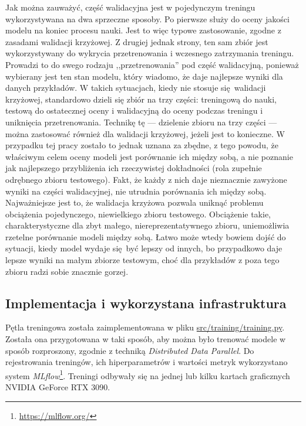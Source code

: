 Jak można zauważyć, część walidacyjna jest w pojedynczym treningu wykorzystywana na dwa sprzeczne
sposoby. Po pierwsze służy do oceny jakości modelu na koniec procesu nauki. Jest to więc typowe
zastosowanie, zgodne z zasadami walidacji krzyżowej. Z drugiej jednak strony, ten sam zbiór jest
wykorzystywany do wykrycia przetrenowania i wczesnego zatrzymania treningu. Prowadzi to do swego
rodzaju ,,przetrenowania'' pod część walidacyjną, ponieważ wybierany jest ten stan modelu, który
wiadomo, że daje najlepsze wyniki dla danych przykładów. W takich sytuacjach, kiedy nie stosuje
się walidacji krzyżowej, standardowo dzieli się zbiór na trzy części: treningową do nauki, testową
do ostatecznej oceny i walidacyjną do oceny podczas treningu i uniknięcia przetrenowania. Technikę
tę --- dzielenie zbioru na trzy części --- można zastosować również dla walidacji krzyżowej, jeżeli
jest to konieczne. W przypadku tej pracy zostało to jednak uznana za zbędne, z tego powodu, że
właściwym celem oceny modeli jest porównanie ich między sobą, a nie poznanie jak najlepszego
przybliżenia ich rzeczywistej dokładności (rola zupełnie odrębnego zbioru testowego). Fakt, że każdy
z nich daje nieznacznie zawyżone wyniki na części walidacyjnej, nie utrudnia porównania ich między
sobą. Najważniejsze jest to, że walidacja krzyżowa pozwala uniknąć problemu obciążenia pojedynczego,
niewielkiego zbioru testowego. Obciążenie takie, charakterystyczne dla zbyt małego,
niereprezentatywnego zbioru, uniemożliwia rzetelne porównanie modeli między sobą. Łatwo może wtedy
bowiem dojść do sytuacji, kiedy model wydaje się być lepszy od innych, bo przypadkowo daje lepsze
wyniki na małym zbiorze testowym, choć dla przykładów z poza tego zbioru radzi sobie znacznie
gorzej.

\subsection{Implementacja i wykorzystana infrastruktura}

Pętla treningowa została zaimplementowana w pliku \url{src/training/training.py}. Została ona
przygotowana w taki sposób, aby można było trenować modele w sposób rozproszony, zgodnie z techniką
\emph{Distributed Data Parallel}. Do rejestrowania treningów, ich hiperparametrów i wartości metryk
wykorzystano system \emph{MLflow}\footnote{\url{https://mlflow.org/}}. Treningi odbywały się na
jednej lub kilku kartach graficznych NVIDIA GeForce RTX 3090.

